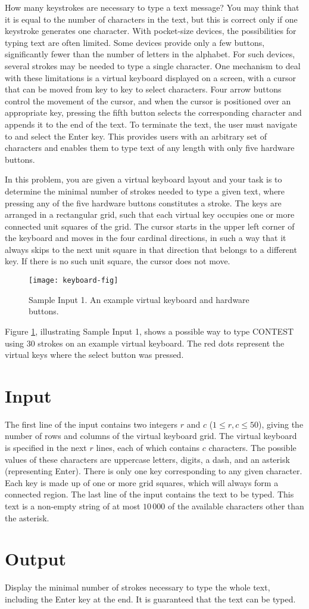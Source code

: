 
How many keystrokes are necessary to type a text message? You may think that it is equal to the number of characters in the text, but this is correct only if one keystroke generates one character. With pocket-size devices, the possibilities for typing text are often limited. Some devices provide only a few buttons, significantly fewer than the number of letters in the alphabet. For such devices, several strokes may be needed to type a single character. 
One mechanism to deal with these limitations is a virtual keyboard displayed on a screen, with a cursor that can be moved from key to key to select characters. Four arrow buttons control the movement of the cursor, and when the cursor is positioned over an appropriate key, pressing the fifth button selects the corresponding character and appends it to the end of the text. To terminate the text, the user must navigate to and select the Enter key. This provides users with an arbitrary set of characters and enables them to type text of any length with only five hardware buttons.
 
In this problem, you are given a virtual keyboard layout and your task is to determine the minimal number of strokes needed to type a given text, where pressing any of the five hardware buttons constitutes a stroke. 
The keys are arranged in a rectangular grid, such that each virtual key occupies one or more connected unit squares of the grid. The cursor starts in the upper left corner of the keyboard and moves in the four cardinal directions, in such a way that it always skips to the next unit square in that direction that belongs to a different key.
If there is no such unit square, the cursor does not move.

\begin{figure}[!h]
	\centering
	\texttt{[image: keyboard-fig]}
	\caption{Sample Input 1. An example virtual keyboard and hardware buttons.}
	\label{fig:keyboard}
\end{figure}

Figure \ref{fig:keyboard}, illustrating Sample Input 1, shows a possible way to type CONTEST using 30 strokes on an example virtual keyboard. The red dots represent the virtual keys where the select button was pressed.

\section*{Input}
The first line of the input contains two integers $r$ and $c$ ($1 \leq r, c \leq 50$), giving the number of rows and columns of the virtual keyboard grid.
The virtual keyboard is specified in the next $r$ lines, each of which contains $c$ characters.  The possible values of these characters are uppercase letters, digits, a dash, and an asterisk (representing Enter).
There is only one key corresponding to any given character.
Each key is made up of one or more grid squares, which will always form a connected region. The last line of the input contains the text to be typed. This text is a non-empty string of at most $10\,000$ of the available characters other than the asterisk.

\section*{Output}

Display the minimal number of strokes necessary to type the whole text, including the Enter key at the end. It is guaranteed that the text can be typed.
